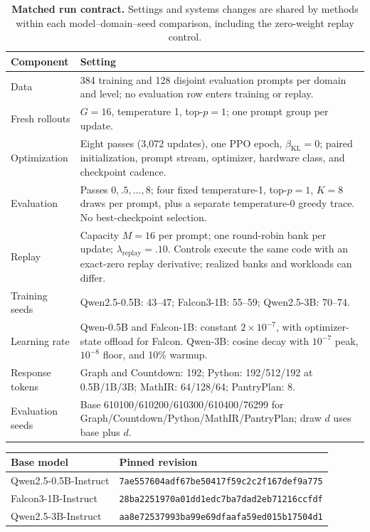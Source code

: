 \documentclass{article}
\newcommand{\1}{\mathbf 1}
\theoremstyle{remark}
\theoremstyle{definition}
\theoremstyle{plain}
\begin{document}
\begin{table}[H]
  \centering
  \caption{\textbf{Matched run contract.} Settings and systems changes are
  shared by methods within each model--domain--seed comparison, including
  the zero-weight replay control.}
  \label{tab:run-contract}
  \small
  \begin{tabularx}{\linewidth}{@{}P{.23\linewidth}Y@{}}
    \toprule
    \textbf{Component} & \textbf{Setting} \\
    \midrule
    Data & 384 training and 128 disjoint evaluation prompts per domain and
      level; no evaluation row enters training or replay. \\
    Fresh rollouts & $G=16$, temperature 1, top-$p=1$; one prompt group per update. \\
    Optimization & Eight passes (3,072 updates), one PPO epoch,
      $\beta_{\mathrm{KL}}=0$; paired initialization, prompt stream,
      optimizer, hardware class, and checkpoint cadence. \\
    Evaluation & Passes $0,.5,\ldots,8$; four fixed temperature-1,
      top-$p=1$, $K=8$ draws per prompt, plus a separate temperature-0
      greedy trace. No best-checkpoint selection. \\
    Replay & Capacity $M=16$ per prompt; one round-robin bank per update;
      $\lambda_{\mathrm{replay}}=.10$. Controls execute the same code with
      an exact-zero replay derivative; realized banks and workloads can differ. \\
    Training seeds & Qwen2.5-0.5B: 43--47; Falcon3-1B: 55--59;
      Qwen2.5-3B: 70--74. \\
    Learning rate & Qwen-0.5B and Falcon-1B: constant $2\times10^{-7}$,
      with optimizer-state offload for Falcon. Qwen-3B: cosine decay with
      $10^{-7}$ peak, $10^{-8}$ floor, and 10\% warmup. \\
    Response tokens & Graph and Countdown: 192; Python: 192/512/192
      at 0.5B/1B/3B; MathIR: 64/128/64; PantryPlan: 8. \\
    Evaluation seeds & Base 610100/610200/610300/610400/76299 for
      Graph/Countdown/Python/MathIR/PantryPlan; draw $d$ uses base plus $d$. \\
    \bottomrule
  \end{tabularx}
\end{table}

\begin{center}
\small
\begin{tabular}{@{}ll@{}}
\toprule
\textbf{Base model} & \textbf{Pinned revision} \\
\midrule
Qwen2.5-0.5B-Instruct & {\scriptsize\texttt{7ae557604adf67be50417f59c2c2f167def9a775}} \\
Falcon3-1B-Instruct & {\scriptsize\texttt{28ba2251970a01dd1edc7ba7dad2eb71216ccfdf}} \\
Qwen2.5-3B-Instruct & {\scriptsize\texttt{aa8e72537993ba99e69dfaafa59ed015b17504d1}} \\
\bottomrule
\end{tabular}
\end{center}
\end{document}
